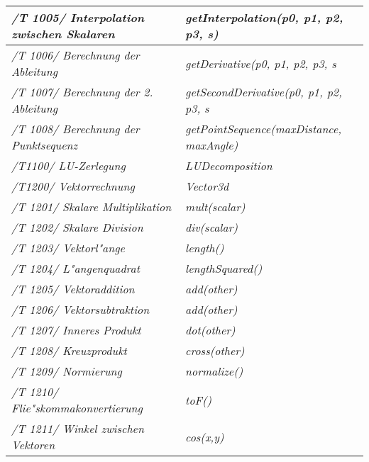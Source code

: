 \begin{longtable}{|p{.3\linewidth}|p{}}
\textit{ /T 1005/ Interpolation zwischen Skalaren} &  \textit{getInterpolation(p0, p1, p2, p3, s)}\\\hline

\textit{ /T 1006/ Berechnung der Ableitung} &  \textit{getDerivative(p0, p1, p2, p3, s}\\\hline

\textit{ /T 1007/ Berechnung der 2. Ableitung} &  \textit{getSecondDerivative(p0, p1, p2, p3, s}\\\hline

\textit{ /T 1008/ Berechnung der Punktsequenz} &  \textit{getPointSequence(maxDistance, maxAngle)}\\\hline

\textit{/T1100/ LU-Zerlegung}  &  \textit{LUDecomposition}\\\hline

\textit{/T1200/ Vektorrechnung} &  \textit{Vector3d}\\\hline

\textit{/T 1201/ Skalare Multiplikation} & \textit{mult(scalar)}\\\hline

\textit{ /T 1202/ Skalare Division} &  \textit{div(scalar)}\\\hline

\textit{ /T 1203/ Vektorl"ange} &  \textit{length()}\\\hline

\textit{ /T 1204/ L"angenquadrat} &  \textit{lengthSquared()}\\\hline

\textit{ /T 1205/ Vektoraddition} &  \textit{add(other)}\\\hline

\textit{ /T 1206/ Vektorsubtraktion} &  \textit{add(other)}\\\hline

\textit{ /T 1207/ Inneres Produkt} &  \textit{dot(other)}\\\hline

\textit{ /T 1208/ Kreuzprodukt} &  \textit{cross(other)}\\\hline

\textit{ /T 1209/ Normierung} & \textit{normalize()}\\\hline

\textit{ /T 1210/ Flie"skommakonvertierung} &  \textit{toF()}\\\hline

\textit{ /T 1211/ Winkel zwischen Vektoren}  &  \textit{cos(x,y)}\\\hline


\end{longtable}
